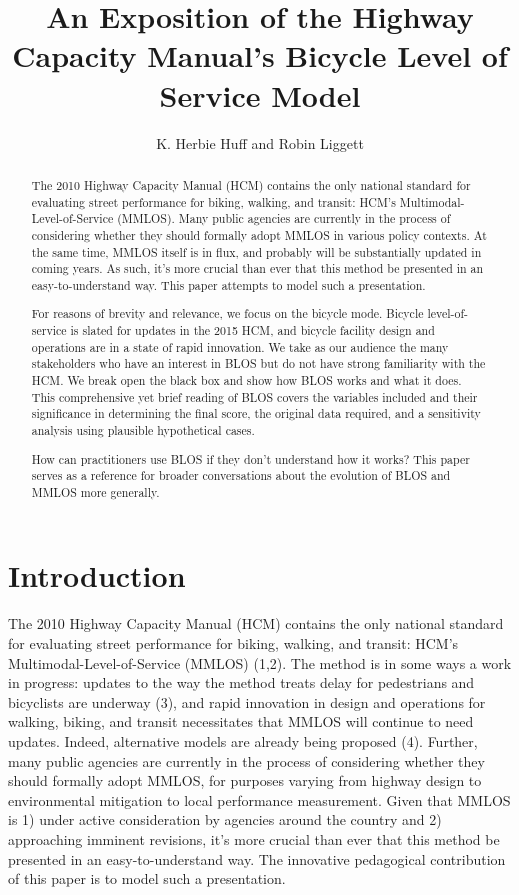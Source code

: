 \documentclass[11pt]{article} %
\title{An Exposition of the Highway Capacity Manual's Bicycle Level of Service Model}
\author{K. Herbie Huff and Robin Liggett}
\begin{document}
\linenumbers

\begin{abstract}
\normalsize
The 2010 Highway Capacity Manual (HCM) contains the only national standard for evaluating street performance for biking, walking, and transit: HCM’s Multimodal-Level-of-Service (MMLOS). Many public agencies are currently in the process of considering whether they should formally adopt MMLOS in various policy contexts. At the same time, MMLOS itself is in flux, and probably will be substantially updated in coming years. As such, it’s more crucial than ever that this method be presented in an easy-to-understand way. This paper attempts to model such a presentation.

For reasons of brevity and relevance, we focus on the bicycle mode. Bicycle level-of-service is slated for updates in the 2015 HCM, and bicycle facility design and operations are in a state of rapid innovation. We take as our audience the many stakeholders who have an interest in BLOS but do not have strong familiarity with the HCM. We break open the black box and show how BLOS works and what it does. This comprehensive yet brief reading of BLOS covers the variables included and their significance in determining the final score, the original data required, and a sensitivity analysis using plausible hypothetical cases. 

How can practitioners use BLOS if they don’t understand how it works? This paper serves as a reference for broader conversations about the evolution of BLOS and MMLOS more generally.

\thispagestyle{empty}
\newpage

\end{abstract}

\section{Introduction}


The 2010 Highway Capacity Manual (HCM) contains the only national standard for evaluating street performance for biking, walking, and transit: HCM’s Multimodal-Level-of-Service (MMLOS) (1,2). The method is in some ways a work in progress: updates to the way the method treats delay for pedestrians and bicyclists are underway (3), and rapid innovation in design and operations for walking, biking, and transit necessitates that MMLOS will continue to need updates. Indeed, alternative models are already being proposed (4). Further, many public agencies are currently in the process of considering whether they should formally adopt MMLOS, for purposes varying from highway design to environmental mitigation to local performance measurement. Given that MMLOS is 1) under active consideration by agencies around the country and 2) approaching imminent revisions, it’s more crucial than ever that this method be presented in an easy-to-understand way. The innovative pedagogical contribution of this paper is to model such a presentation.
\end{document}
